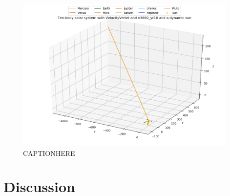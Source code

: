 \documentclass{article}
\begin{document}
    \begin{figure}[H]
        \centering
        \includegraphics[width = 11cm]{img/plot3D_10body_V_n3660_yr10_dynamic_sun.png}
        \caption{CAPTIONHERE}
        \label{fig:plot3D_10body_V_n3660_yr10_dynamic_sun}
    \end{figure}

\vspace{1cm}

\clearpage
\newpage

\section{Discussion} \label{sec:Discussion}
\end{document}
